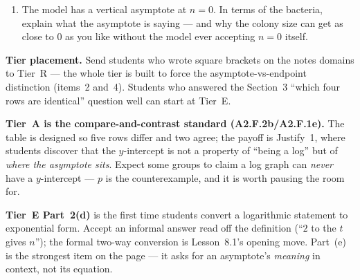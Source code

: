 \documentclass[10pt]{article}
\begin{document}
\begin{tcolorbox}[colback=white, colframe=black!40, title=\textbf{Tier E --- Extension},
    fonttitle=\bfseries, arc=1.5mm, left=3mm, right=3mm, top=2mm, bottom=2mm, breakable]
\begin{enumerate}[label=(\alph*), leftmargin=1.9em, itemsep=6pt]
        Which function family is that?  \quad What does this tell you about the
        relationship between $t(n)$ and the function you just wrote? 
  \item The model has a vertical asymptote at $n=0$. In terms of the bacteria, explain what the
        asymptote is saying --- and why the colony size can get as close to $0$ as you like without
        the model ever accepting $n=0$ itself. 
\end{enumerate}
\end{tcolorbox}

\begin{teachernote}
\textbf{Tier placement.} Send students who wrote square brackets on the notes domains to Tier~R --- the
whole tier is built to force the asymptote-vs-endpoint distinction (items~2 and~4). Students who
answered the Section~3 ``which four rows are identical'' question well can start at Tier~E.

\textbf{Tier~A is the compare-and-contrast standard (A2.F.2b/A2.F.1e).} The table is designed so
five rows differ and two agree; the payoff is Justify~1, where students discover that the
$y$-intercept is not a property of ``being a log'' but of \emph{where the asymptote sits}. Expect
some groups to claim a log graph can \emph{never} have a $y$-intercept --- $p$ is the counterexample,
and it is worth pausing the room for.

\textbf{Tier~E Part~2(d)} is the first time students convert a logarithmic statement to exponential
form. Accept an informal answer read off the definition (``$2$ to the $t$ gives $n$''); the formal
two-way conversion is Lesson~8.1's opening move. Part~(e) is the strongest item on the page --- it
asks for an asymptote's \emph{meaning} in context, not its equation.
\end{teachernote}
\end{document}
